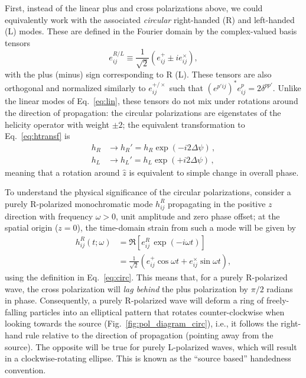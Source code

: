 \documentclass[aps,prd,twocolumn,superscriptaddress,preprintnumbers,floatfix,nofootinbib]{revtex4-2}
\newcommand{\beq}{\begin{equation}}
\newcommand{\eeq}{\end{equation}}
\begin{document}
First, instead of the linear plus and cross polarizations above, we could equivalently work with the associated \emph{circular} right-handed (R) and left-handed (L) modes.
These are defined in the Fourier domain by the complex-valued basis tensors
\beq \label{eq:circ}
e^{R/L}_{ij} \equiv \frac{1}{\sqrt{2}} \left(e^+_{ij} \pm i e^\times_{ij} \right) ,
\eeq
with the plus (minus) sign corresponding to R (L).
These tensors are also orthogonal and normalized similarly to $e^{+/\times}_{ij}$ such that $(e^{p'ij})^* e^p_{ij} = 2 \delta^{pp'}$.
Unlike the linear modes of Eq.~\eqref{eq:lin}, these tensors do not mix under rotations around the direction of propagation:
the circular polarizations are eigenstates of the helicity operator with weight $\pm 2$;
the equivalent transformation to Eq.~\eqref{eq:htransf} is
\begin{subequations} \label{eq:htransf}
\begin{align}
h_R &\rightarrow h_R' = h_R \exp(- i2  \Delta \psi) \, ,\\
h_L &\rightarrow h_L' = h_L \exp(+ i2  \Delta \psi)\, ,
\end{align}
\end{subequations}
meaning that a rotation around $\hat{z}$ is equivalent to simple change in overall phase.


To understand the physical significance of the circular polarizations,
consider a purely R-polarized monochromatic mode $h^R_{ij}$ propagating in the positive $z$ direction with frequency $\omega > 0$, unit amplitude and zero phase offset; at the spatial origin ($z=0$), the time-domain strain from such a mode will be given by
\begin{align} \label{eq:circ_example}
h_{ij}^R(t;\omega) &= \Re \left[ e^R_{ij}\, \exp(-i\omega t) \right] \nonumber\\
&= \frac{1}{\sqrt{2}} \left( e^+_{ij} \cos \omega t + e^\times_{ij} \sin \omega t \right) ,
\end{align}
using the definition in Eq.~\eqref{eq:circ}.
This means that, for a purely R-polarized wave, the cross polarization will \emph{lag behind} the plus polarization by $\pi/2$ radians in phase.
Consequently, a purely R-polarized wave will deform a ring of freely-falling particles into an elliptical pattern that rotates counter-clockwise when looking towards the source (Fig.~\ref{fig:pol_diagram_circ}), i.e., it follows the right-hand rule relative to the direction of propagation (pointing away from the source).
The opposite will be true for purely L-polarized waves, which will result in a clockwise-rotating ellipse.%
This is known as the ``source based'' handedness convention.
\end{document}
